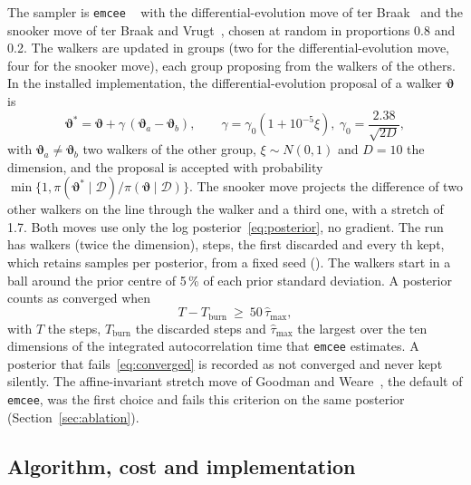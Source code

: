 \documentclass[journal]{IEEEtran}
\newcommand{\pct}{\,\%}
\begin{document}
The sampler is \texttt{emcee} \samplerVersion~\cite{emcee} with the differential-evolution move of ter
Braak~\cite{tb06} and the snooker move of ter Braak and Vrugt~\cite{tbv08}, chosen at random in proportions 0.8 and 0.2.
The walkers are updated in groups (two for the differential-evolution move, four for the snooker move), each group
proposing from the walkers of the others. In the installed
implementation, the differential-evolution proposal of a walker $\boldsymbol\vartheta$ is
\begin{equation}
\boldsymbol\vartheta^{*}=\boldsymbol\vartheta+\gamma\,(\boldsymbol\vartheta_a-\boldsymbol\vartheta_b),\qquad
\gamma=\gamma_0(1+10^{-5}\xi),\ \gamma_0=\frac{2.38}{\sqrt{2D}},
\label{eq:demove}
\end{equation}
with $\boldsymbol\vartheta_a\neq\boldsymbol\vartheta_b$ two walkers of the other group, $\xi\sim N(0,1)$ and $D=10$ the dimension, and the
proposal is accepted with probability $\min\{1,\pi(\boldsymbol\vartheta^{*}\mid\mathcal D)/\pi(\boldsymbol\vartheta\mid\mathcal
D)\}$. The snooker move projects the difference of two other walkers on the line through the walker and a third one, with a
stretch of 1.7. Both moves use only the log posterior~\eqref{eq:posterior}, no gradient. The run has \walkers{} walkers
(twice the dimension), \steps{} steps, the first \burn{} discarded and every \thin{}th kept, which retains \nSamples{}
samples per posterior, from a fixed seed (\seed). The walkers start in a ball around the prior centre of 5\pct{} of each
prior standard deviation. A posterior counts as converged when
\begin{equation}
T-T_{\mathrm{burn}}\ \ge\ 50\,\hat\tau_{\max},
\label{eq:converged}
\end{equation}
with $T$ the steps, $T_{\mathrm{burn}}$ the discarded steps and $\hat\tau_{\max}$ the largest over the ten dimensions of the
integrated autocorrelation time that \texttt{emcee} estimates. A posterior that fails~\eqref{eq:converged} is recorded as
not converged and never kept silently. The affine-invariant stretch move of Goodman and Weare~\cite{gw}, the default of
\texttt{emcee}, was the first choice and fails this criterion on the same posterior (Section~\ref{sec:ablation}).

\subsection{Algorithm, cost and implementation}
\end{document}
